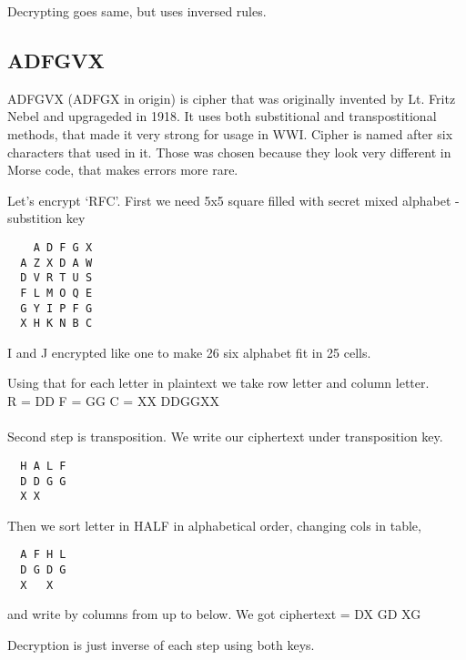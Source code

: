 \documentclass[10pt]{article}
\begin{document}
  Decrypting goes same, but uses inversed rules.

  \subsection{ADFGVX}
  ADFGVX (ADFGX in origin) is cipher that was originally invented by Lt. Fritz Nebel and upgrageded in 1918. It uses both substitional and transpostitional methods, that made it very strong for usage in WWI. 
  Cipher is named after six characters that used in it. Those was chosen because they look very different in Morse code, that makes errors more rare.

  Let's encrypt `RFC'.
  First we need 5x5 square filled with secret mixed alphabet - substition key


  \begin{verbatim}
  	A D F G X
  A Z X D A W
  D V R T U S
  F L M O Q E
  G Y I P F G
  X H K N B C
  \end{verbatim}

  I and J encrypted like one to make 26 six alphabet fit in 25 cells.

  Using that for each letter in plaintext we take row letter and column letter. \\
  R = DD F = GG C = XX
  DDGGXX \\ \\
  Second step is transposition.
  We write our ciphertext under transposition key.
  \begin{verbatim}
  H A L F
  D D G G
  X X
  \end{verbatim}
  Then we sort letter in HALF in alphabetical order, changing cols in table,
  \begin{verbatim}
  A F H L 
  D G D G 
  X   X
  \end{verbatim}
  and write by columns from up to below.
  We got ciphertext = DX GD XG

  Decryption is just inverse of each step using both keys.
\end{document}
